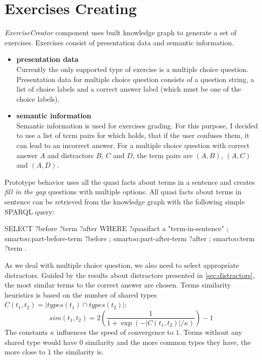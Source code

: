 \documentclass[12pt, twoside]{fithesis2}
\renewcommand{\_}{\leavevmode \kern0.07em\vbox{\hrule width0.4em}}
\newcommand{\squarebullet}{\textcolor{black}{\raisebox{0.15em}{\rule{4pt}{4pt}}}}
\newcommand{\emptysquarebullet}{\textcolor{black}{\raisebox{0.10em}{\tiny$\square$}}}
\newenvironment{myItemize}{
  \begin{itemize}[leftmargin=2em,rightmargin=1em,itemsep=\parskip ,parsep=0em,topsep=0em,partopsep=0em]
  \renewcommand{\labelitemi}{\squarebullet}
  \renewcommand{\labelitemii}{\textbullet}
}{
  \end{itemize}
}
\newcounter{choice}
\begin{document}
\section{Exercises Creating}
\label{sec:smartoo-exercises}

\textit{ExerciseCreator} component uses built knowledge graph to generate a set of exercises.
Exercises consist of presentation data and semantic information.
\begin{myItemize}
  \item \textbf{presentation data}\\
    Currently the only supported type of exercise is a multiple choice question. Presentation data for multiple choice question consists of a question string, a list of choice labels and a correct answer label (which must be one of the choice labels).
  \item \textbf{semantic information}\\
    Semantic information is used for exercises grading. For this purpose, I decided to use a list of term pairs for which holds, that if the user confuses them, it can lead to an incorrect answer.
    For a multiple choice question with correct answer $A$ and distractors $B$, $C$ and $D$,
    the term pairs are $(A, B)$, $(A, C)$ and $(A, D)$.
\end{myItemize}


Prototype behavior uses all the quasi facts about terms in a sentence and creates \emph{fill in the gap} questions with multiple options.
All quasi facts about terms in sentence can be retrieved from the knowledge graph with the following simple SPARQL query:
\begin{code}
SELECT ?before ?term ?after
WHERE {
    ?quasifact a "term-in-sentence" ;
        smartoo:part-before-term ?before ;
        smartoo:part-after-term ?after ;
        smartoo:term ?term .
}
\end{code}

As we deal with multiple choice question, we also need to select appropriate distractors.
Guided by the results about distractors presented in \autoref{sec:distractors},
the most similar terms to the correct answer are chosen.
Terms similarity heuristics is based on the number of shared types
$C(t_1, t_2) = |types(t_1) \cap types(t_2)|$:
$$
sim(t_1, t_2) = 2 \left( \frac{1}{1 + \exp({-|C(t_1, t_2)| / \kappa})} \right) - 1
$$
The constants $\kappa$ influences the speed of convergence to $1$.
Terms without any shared type would have $0$ similarity and the more common types they have, the more close to $1$ the similarity is.
\end{document}
